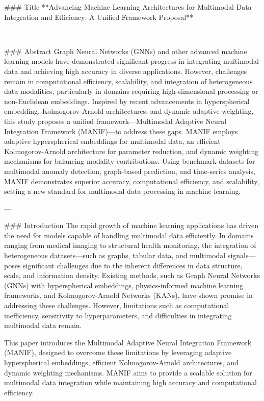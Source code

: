 ### Title
**Advancing Machine Learning Architectures for Multimodal Data Integration and Efficiency: A Unified Framework Proposal**

---

### Abstract
Graph Neural Networks (GNNs) and other advanced machine learning models have demonstrated significant progress in integrating multimodal data and achieving high accuracy in diverse applications. However, challenges remain in computational efficiency, scalability, and integration of heterogeneous data modalities, particularly in domains requiring high-dimensional processing or non-Euclidean embeddings. Inspired by recent advancements in hyperspherical embedding, Kolmogorov-Arnold architectures, and dynamic adaptive weighting, this study proposes a unified framework—Multimodal Adaptive Neural Integration Framework (MANIF)—to address these gaps. MANIF employs adaptive hyperspherical embeddings for multimodal data, an efficient Kolmogorov-Arnold architecture for parameter reduction, and dynamic weighting mechanisms for balancing modality contributions. Using benchmark datasets for multimodal anomaly detection, graph-based prediction, and time-series analysis, MANIF demonstrates superior accuracy, computational efficiency, and scalability, setting a new standard for multimodal data processing in machine learning.

---

### Introduction
The rapid growth of machine learning applications has driven the need for models capable of handling multimodal data efficiently. In domains ranging from medical imaging to structural health monitoring, the integration of heterogeneous datasets—such as graphs, tabular data, and multimodal signals—poses significant challenges due to the inherent differences in data structure, scale, and information density. Existing methods, such as Graph Neural Networks (GNNs) with hyperspherical embeddings, physics-informed machine learning frameworks, and Kolmogorov-Arnold Networks (KANs), have shown promise in addressing these challenges. However, limitations such as computational inefficiency, sensitivity to hyperparameters, and difficulties in integrating multimodal data remain.

This paper introduces the Multimodal Adaptive Neural Integration Framework (MANIF), designed to overcome these limitations by leveraging adaptive hyperspherical embeddings, efficient Kolmogorov-Arnold architectures, and dynamic weighting mechanisms. MANIF aims to provide a scalable solution for multimodal data integration while maintaining high accuracy and computational efficiency.

